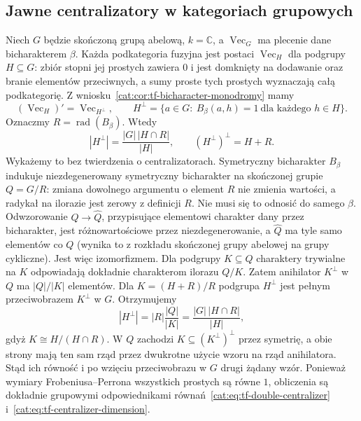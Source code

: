 \subsection{Jawne centralizatory w kategoriach grupowych}

\begin{przyklad}\label{cat:ex:tf-bicharacter-centralizer}
Niech $G$ będzie skończoną grupą abelową, $k=\mathbb C$, a $\operatorname{Vec}_G$ ma plecenie dane bicharakterem $\beta$. Każda podkategoria fuzyjna jest postaci $\operatorname{Vec}_H$ dla podgrupy $H\subseteq G$: zbiór stopni jej prostych zawiera $0$ i jest domknięty na dodawanie oraz branie elementów przeciwnych, a sumy proste tych prostych wyznaczają całą podkategorię. Z wniosku~\ref{cat:cor:tf-bicharacter-monodromy} mamy
\[
 (\operatorname{Vec}_H)'=\operatorname{Vec}_{H^\perp},
 \qquad H^\perp=\{a\in G:\ B_\beta(a,h)=1\ \text{dla każdego }h\in H\}.
\]
Oznaczmy $R=\operatorname{rad}(B_\beta)$. Wtedy
\[
 |H^\perp|=\frac{|G|\,|H\cap R|}{|H|},
 \qquad (H^\perp)^\perp=H+R.
\]
Wykażemy to bez twierdzenia o centralizatorach. Symetryczny bicharakter $B_\beta$ indukuje niezdegenerowany symetryczny bicharakter na skończonej grupie $Q=G/R$: zmiana dowolnego argumentu o element $R$ nie zmienia wartości, a radykał na ilorazie jest zerowy z definicji $R$. Nie musi się to odnosić do samego $\beta$. Odwzorowanie $Q\to\widehat Q$, przypisujące elementowi charakter dany przez bicharakter, jest różnowartościowe przez niezdegenerowanie, a $\widehat Q$ ma tyle samo elementów co $Q$ (wynika to z rozkładu skończonej grupy abelowej na grupy cykliczne). Jest więc izomorfizmem. Dla podgrupy $K\subseteq Q$ charaktery trywialne na $K$ odpowiadają dokładnie charakterom ilorazu $Q/K$. Zatem anihilator $K^\perp$ w $Q$ ma $|Q|/|K|$ elementów. Dla $K=(H+R)/R$ podgrupa $H^\perp$ jest pełnym przeciwobrazem $K^\perp$ w $G$. Otrzymujemy
\[
 |H^\perp|=|R|\frac{|Q|}{|K|}
 =\frac{|G|\,|H\cap R|}{|H|},
\]
gdyż $K\cong H/(H\cap R)$. W $Q$ zachodzi $K\subseteq(K^\perp)^\perp$ przez symetrię, a obie strony mają ten sam rząd przez dwukrotne użycie wzoru na rząd anihilatora. Stąd ich równość i po wzięciu przeciwobrazu w $G$ drugi żądany wzór. Ponieważ wymiary Frobeniusa--Perrona wszystkich prostych są równe $1$, obliczenia są dokładnie grupowymi odpowiednikami równań~\eqref{cat:eq:tf-double-centralizer} i~\eqref{cat:eq:tf-centralizer-dimension}.
\end{przyklad}

